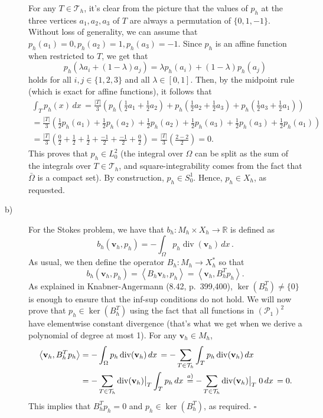 \documentclass[a4paper]{article}
\renewcommand{\vec}[1]{\mathbf{#1}}
\DeclareMathOperator{\diver}{div}
\newcommand{\dx}{\, dx \,}
\newcommand{\area}[1]{\left\lvert #1 \right\rvert}
\newcommand{\dpair}[1]{\left\langle #1 \right\rangle}
\newcommand{\R}{\mathbb{R}}
\begin{document}
\begin{description}
	For any $T \in \mathcal{T}_h$, it's clear from the picture that the values
	of $p_h$ at the three vertices $a_1,a_2,a_3$ of $T$ are always a permutation
	of $\{0,1,-1\}$. Without loss of generality, we can assume that
	$p_h(a_1) = 0, p_h(a_2) = 1, p_h(a_3) = -1$.
	Since $p_h$ is an affine function when restricted to $T$, we get that
	\[
	p_h(\lambda a_i + (1-\lambda) a_j) = \lambda p_h(a_i) + (1-\lambda) p_h(a_j)
	\]
	holds for all $i,j \in \{1,2,3\}$ and all $\lambda \in [0,1]$.
	Then, by the midpoint rule (which is exact for affine functions), it follows that
	\begin{gather*}
	\int_T p_h(x) \dx
	= \frac{\area{T}}{3} \left(
		  p_h \left( \frac{1}{2} a_1 + \frac{1}{2} a_2 \right)
		+ p_h \left( \frac{1}{2} a_2 + \frac{1}{2} a_3 \right)
		+ p_h \left( \frac{1}{2} a_3 + \frac{1}{2} a_1 \right) \right) \\
	= \frac{\area{T}}{3} \left(
		  \frac{1}{2} p_h(a_1) + \frac{1}{2} p_h(a_2)
		+ \frac{1}{2} p_h(a_2) + \frac{1}{2} p_h(a_3)
		+ \frac{1}{2} p_h(a_3) + \frac{1}{2} p_h(a_1) \right) \\
	= \frac{\area{T}}{3} \left(
		  \frac{0}{2}  + \frac{1}{2}
		+ \frac{1}{2}  + \frac{-1}{2}
		+ \frac{-1}{2} + \frac{0}{2} \right)
	= \frac{\area{T}}{3} \left( \frac{2-2}{2} \right)
	= 0.
	\end{gather*}
	This proves that $p_h \in L_0^2$ (the integral over $\Omega$ can be split
	as the sum of the integrals over $T \in \mathcal{T}_h$,
	and square-integrability comes from the fact that
	$\bar{\Omega}$ is a compact set). By construction, $p_h \in S_0^1$.
	Hence, $p_h \in X_h$, as requested.
\item[b)] For the Stokes problem, we have that $b_h \colon M_h \times X_h \to \R$
	is defined as
	\[
	b_h(\vec{v}_h,p_h) = -\int_\Omega p_h \diver(\vec{v}_h) \dx.
	\]
	As usual, we then define the operator $B_h \colon M_h \to X_h^*$ so that
	\[
	b_h(\vec{v}_h,p_h) = \dpair{B_h \vec{v}_h,p_h} = \dpair{\vec{v}_h, B_h^T p_h}.
	\]
	As explained in Knabner-Angermann (8.42, p.\ 399,400), $\ker(B_h^T) \neq \{0\}$
	is enough to ensure that the inf-sup conditions do not hold.
	We will now prove that $p_h \in \ker(B_h^T)$ using the fact that all
	functions in $(\mathcal{P}_1)^2$ have elementwise constant divergence
	(that's what we get when we derive a polynomial of degree at most 1).
	For any $\vec{v}_h \in M_h$,
	\begin{align*}
	\dpair{\vec{v}_h, B_h^T p_h}
&	= -\int_\Omega p_h \diver(\vec{v}_h) \dx
	= -\sum_{T \in \mathcal{T}_h} \int_T p_h \diver(\vec{v}_h) \dx \\
&	= -\sum_{T \in \mathcal{T}_h} \diver(\vec{v}_h) \big{|}_T \int_T p_h \dx
	\stackrel{a)}{=} -\sum_{T \in \mathcal{T}_h} \diver(\vec{v}_h) \big{|}_T \; 0 \dx
	= 0.
	\end{align*}
	This implies that $B_h^T p_h = 0$ and $p_h \in \ker(B_h^T)$, as required. $\square$
\end{description}
\end{document}
